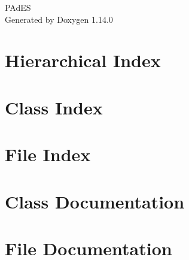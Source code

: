 \documentclass[twoside]{book}
\newcommand{\+}{\discretionary{\mbox{\scriptsize$\hookleftarrow$}}{}{}}
\newcommand{\clearemptydoublepage}{%
    \newpage{\pagestyle{empty}\cleardoublepage}%
  }
\begin{document}
  \raggedbottom
    \hypersetup{pageanchor=false,
                bookmarksnumbered=true,
                pdfencoding=unicode
               }
  \begin{titlepage}
  \vspace*{7cm}
  \begin{center}%
  {\Large PAd\+ES}\\
  \vspace*{1cm}
  {\large Generated by Doxygen 1.14.0}\\
  \end{center}
  \end{titlepage}
  \clearemptydoublepage
  \tableofcontents
  \clearemptydoublepage
  \hypersetup{pageanchor=true}
\chapter{Hierarchical Index}

\chapter{Class Index}

\chapter{File Index}

\chapter{Class Documentation}


\chapter{File Documentation}


  \backmatter
  \newpage
  \clearemptydoublepage
  \printindex
\end{document}
